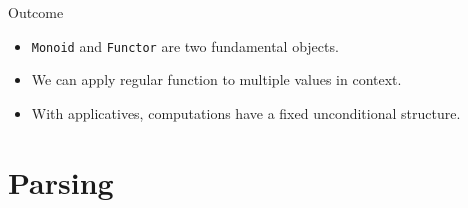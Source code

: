 \documentclass[presentation,aspectratio=169,smaller]{beamer}
\begin{document}
\begin{frame}[label={sec:org27f6dda},fragile]{Outcome}
 \begin{itemize}
\item <1-> \texttt{Monoid} and \texttt{Functor} are two fundamental objects.
\item <2-> We can apply regular function to multiple values in context.
\item <3-> With applicatives, computations have a fixed unconditional structure.
\end{itemize}
\end{frame}

\section{Parsing}
\label{sec:org6301a16}
\end{document}
